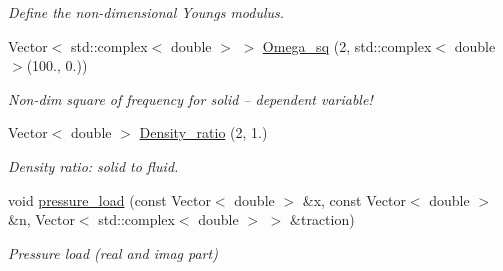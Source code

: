 \begin{DoxyCompactItemize}
\begin{DoxyCompactList}\small\item\em Define the non-\/dimensional Young\textquotesingle{}s modulus. \end{DoxyCompactList}\item 
Vector$<$ std\+::complex$<$ double $>$ $>$ \hyperlink{namespaceGlobal__Parameters_a398dea5c8e21c725d5b5bd37e9a8b89a}{Omega\+\_\+sq} (2, std\+::complex$<$ double $>$(100., 0.))
\begin{DoxyCompactList}\small\item\em Non-\/dim square of frequency for solid -- dependent variable! \end{DoxyCompactList}\item 
Vector$<$ double $>$ \hyperlink{namespaceGlobal__Parameters_a85fdbf42d4840523f24ff7ee26ea1616}{Density\+\_\+ratio} (2, 1.)
\begin{DoxyCompactList}\small\item\em Density ratio\+: solid to fluid. \end{DoxyCompactList}\item 
void \hyperlink{namespaceGlobal__Parameters_a0ddb3a77481b907fbb34f2e8d0a6eb9f}{pressure\+\_\+load} (const Vector$<$ double $>$ \&x, const Vector$<$ double $>$ \&n, Vector$<$ std\+::complex$<$ double $>$ $>$ \&traction)
\begin{DoxyCompactList}\small\item\em Pressure load (real and imag part) \end{DoxyCompactList}\end{DoxyCompactItemize}
